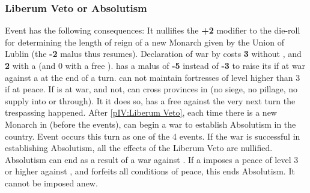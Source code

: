 \subsubsection{Liberum Veto or Absolutism}
\label{chSpecific:Poland:Liberum Veto} Event
 has the following consequences:
\bparag It nullifies the {\bf +2} modifier to the die-roll for
determining the length of reign of a new Monarch given by the Union of
Lublin (the {\bf -2} malus thus resumes).
\bparag Declaration of war by \POL costs {\bf 3} \STAB without \CB, and
{\bf 2} \STAB with a \CB (and 0 with a free \CB).
\bparag \POL has a malus of {\bf -5} instead of {\bf -3} to raise its
\STAB if at war against a \MAJ at the end of a turn.
\bparag \POL can not maintain fortresses of level higher than 3 if at
peace.
\bparag If \RUS is at war, and \POL not, \RUS can cross provinces in
\POL (no siege, no pillage, no supply into or through). It it does so,
\POL has a free \CB against \RUS the very next turn the trespassing
happened.
\label{chSpecific:Poland:Absolutism} After
\ref{pIV:Liberum Veto}, each time there is a new Monarch in \POL
(before the events), \POL can begin a war to establish Absolutism in
the country. Event  occurs this turn
as one of the 4 events.
\bparag If the war is successful in establishing Absolutism, all the
effects of the Liberum Veto are nullified.
\bparag Absolutism can end as a result of a war against \POL. If a \MAJ
imposes a peace of level 3 or higher against \POL, and forfeits all
conditions of peace, this ends Absolutism. It cannot be imposed anew.
